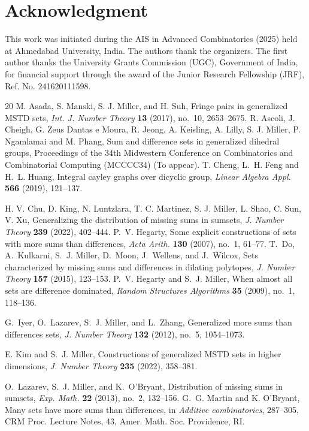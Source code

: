 \documentclass[11pt,reqno]{amsart}
\numberwithin{equation}{section}
\begin{document}
\section*{Acknowledgment}
This work was initiated during the AIS in Advanced Combinatorics (2025) held at Ahmedabad University, India. The authors thank the organizers. The first author thanks the University Grants Commission (UGC), Government of India, for financial support through the award of the Junior Research Fellowship (JRF), Ref. No. 241620111598.

\begin{thebibliography}{20}
 M. Asada, S. Manski, S. J. Miller, and H. Suh, Fringe pairs in generalized MSTD sets, {\it Int. J. Number Theory} {\bf 13} (2017), no.~10, 2653--2675.
 R. Ascoli, J. Cheigh, G. Zeus Dantas e Moura, R. Jeong, A. Keisling, A. Lilly, S. J. Miller, P. Ngamlamai and M. Phang, Sum and difference sets in generalized dihedral groups, Proceedings of the 34th Midwestern Conference on Combinatorics and Combinatorial Computing (MCCCC34) (To appear).
T. Cheng, L.~H. Feng and H.~L. Huang, Integral cayley graphs over dicyclic group, {\it Linear Algebra Appl.} {\bf 566} (2019), 121--137.

 H. V. Chu, D. King, N. Luntzlara, T. C. Martinez, S. J. Miller, L. Shao, C. Sun, V. Xu, Generalizing the distribution of missing sums in sumsets, {\it J. Number Theory} {\bf 239} (2022), 402--444.
P.~V. Hegarty, Some explicit constructions of sets with more sums than differences, {\it Acta Arith.} {\bf 130} (2007), no.~1, 61--77.
T.~Do, A.~Kulkarni, S.~J. Miller, D.~Moon, J.~Wellens, and J.~Wilcox,
Sets characterized by missing sums and differences in dilating polytopes,
{\it J. Number Theory} {\bf 157} (2015), 123--153.
P.~V. Hegarty and S.~J. Miller, When almost all sets are difference dominated, {\it Random Structures Algorithms} {\bf 35} (2009), no.~1, 118--136.

G.~Iyer, O.~Lazarev, S.~J. Miller, and L.~Zhang,
Generalized more sums than differences sets,
{\it J. Number Theory} {\bf 132} (2012), no.~5, 1054--1073.

E. Kim and S.~J. Miller, Constructions of generalized MSTD sets in higher dimensions, {\it J. Number Theory} {\bf 235} (2022), 358--381.

O.~Lazarev, S.~J. Miller, and K.~O'Bryant,
Distribution of missing sums in sumsets,
{\it Exp. Math.} {\bf 22} (2013), no.~2, 132--156.
G.~G. Martin and K. O'Bryant, Many sets have more sums than differences, in {\it Additive combinatorics}, 287--305, CRM Proc. Lecture Notes, 43, Amer. Math. Soc. Providence, RI.


\end{thebibliography}
\end{document}
